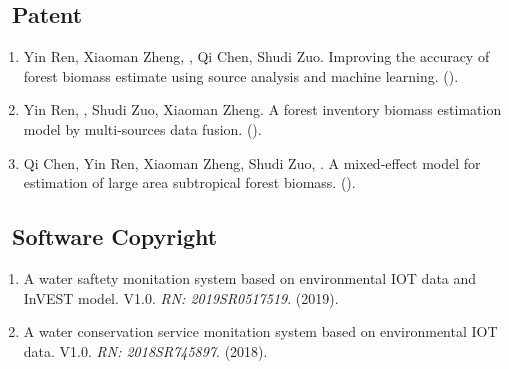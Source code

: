 \subsection*{\texorpdfstring{\faBook\ Patent}{Patent}}
\begin{enumerate}
\item
     Yin Ren, Xiaoman Zheng, \Shaoqing, Qi Chen, Shudi Zuo.
     Improving the accuracy of forest biomass estimate using source analysis and machine learning.
     (\Review).
\item
     Yin Ren, \Shaoqing, Shudi Zuo, Xiaoman Zheng.
     A forest inventory biomass estimation model by multi-sources data fusion.
     (\Review).
\item
     Qi Chen, Yin Ren, Xiaoman Zheng, Shudi Zuo, \Shaoqing.
     A mixed-effect model for estimation of large area subtropical forest biomass.
     (\Review).
\end{enumerate}

\subsection*{\texorpdfstring{\faBook\ Software Copyright}{Software Copyright}}
\begin{enumerate}
\item
    A water saftety monitation system based on environmental IOT data and InVEST model. V1.0.
    \textit{RN: 2019SR0517519}. (2019).
\item
    A water conservation service monitation system based on environmental IOT data. V1.0.
    \textit{RN: 2018SR745897}. (2018).
\end{enumerate}

